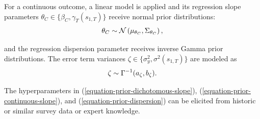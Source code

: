 \documentclass[12pt]{article}
\begin{document}
For a continuous outcome, a linear model is applied and its regression slope parameters $\theta_C \in \{\beta_{C},\gamma_{T}(s_{1,T})\}$ receive normal prior distributions:
\let\saveeqnno\theequation
\let\savefrac\frac
\def\dispfrac{\displaystyle\savefrac}
\begin{eqnarray}
\let\frac\dispfrac
\gdef\theequation{7}
\let\theHequation\theequation
\label{equation-prior-continuous-slope}
	\theta_C \sim \mathcal{N}\left(\mu_{\theta_C},\Sigma_{\theta_C}\right),
\end{eqnarray}
\global\let\theequation\saveeqnno
\addtocounter{equation}{-1}\ignorespaces

and the regression dispersion parameter receives inverse Gamma prior distributions. The error term variances $\zeta \in \{\sigma^2_{y}, \sigma^2(s_{1,T}) \}$ are modeled as
\let\saveeqnno\theequation
\let\savefrac\frac
\def\dispfrac{\displaystyle\savefrac}
\begin{eqnarray}
\let\frac\dispfrac
\gdef\theequation{8}
\let\theHequation\theequation
\label{equation-prior-dispersion}
	\zeta \sim \Gamma^{-1}(a_\zeta,b_\zeta).
\end{eqnarray}
\global\let\theequation\saveeqnno
\addtocounter{equation}{-1}\ignorespaces

The hyperparameters in (\ref{equation-prior-dichotomous-slope}), (\ref{equation-prior-continuous-slope}), and (\ref{equation-prior-dispersion}) can be elicited from historic or similar survey data or expert knowledge.



\end{document}
